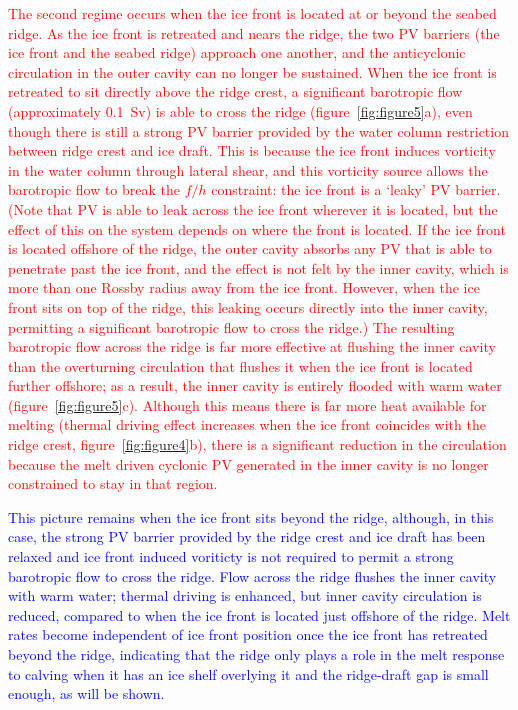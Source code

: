 \documentclass[draft]{agujournal2019}
\newcommand{\red}[1]{\textcolor{red}{#1}}
\newcommand{\blue}[1]{\textcolor{blue}{#1}}
\begin{document}
\red{The second regime occurs when the ice front is located at or beyond the seabed ridge. As the ice front is retreated and nears the ridge, the two PV barriers (the ice front and the seabed ridge) approach one another, and the anticyclonic circulation in the outer cavity can no longer be sustained.  When the ice front is retreated to sit directly above the ridge crest, a significant barotropic flow (approximately 0.1~Sv) is able to cross the ridge (figure~\ref{fig:figure5}a), even though there is still a strong PV barrier provided by the water column restriction between ridge crest and ice draft. This is because the ice front induces vorticity in the water column through lateral shear, and this vorticity source allows the barotropic flow to break the $f/h$ constraint: the ice front is a `leaky' PV barrier. (Note that PV is able to leak across the ice front wherever it is located, but the effect of this on the system depends on where the front is located. If the ice front is located offshore of the ridge, the outer cavity absorbs any PV that is able to penetrate past the ice front, and the effect is not felt by the inner cavity, which is more than one Rossby radius away from the ice front. However, when the ice front sits on top of the ridge, this leaking occurs directly into the inner cavity, permitting a significant barotropic flow to cross the ridge.) The resulting barotropic flow across the ridge is far more effective at flushing the inner cavity than the overturning circulation that flushes it when the ice front is located further offshore; as a result, the inner cavity is entirely flooded with warm water (figure~\ref{fig:figure5}c). Although this means there is far more heat available for melting (thermal driving effect increases when the ice front coincides with the ridge crest, figure~\ref{fig:figure4}b), there is a significant reduction in the circulation because the melt driven cyclonic PV generated in the inner cavity is no longer constrained to stay in that region. }

\blue{This picture remains when the ice front sits beyond the ridge, although, in this case, the strong PV barrier provided by the ridge crest and ice draft has been relaxed and ice front induced voriticty is not required to permit a strong barotropic flow to cross the ridge. Flow across the ridge flushes the inner cavity with warm water; thermal driving is enhanced, but inner cavity circulation is reduced, compared to when the ice front is located just offshore of the ridge. Melt rates become independent of ice front position once the ice front has retreated beyond the ridge, indicating that the ridge only plays a role in the melt response to calving when it has an ice shelf overlying it and the ridge-draft gap is small enough, as will be shown.}
\end{document}
